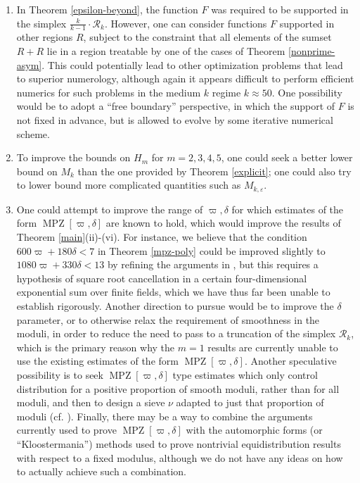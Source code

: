 \documentclass{bmcart}
\DeclareMathOperator*\MPZ{MPZ}
\theoremstyle{plain}
\theoremstyle{definition}
\newcommand\eps{\varepsilon}
\begin{document}
\begin{enumerate}
\item In Theorem \ref{epsilon-beyond}, the function $F$ was required to be supported in the simplex $\frac{k}{k-1} \cdot {\mathcal R}_k$.  However, one can consider functions $F$ supported in other regions $R$, subject to the constraint that all elements of the sumset $R+R$ lie in a region treatable by one of the cases of Theorem \ref{nonprime-asym}.  This could potentially lead to other optimization problems that lead to superior numerology, although again it appears difficult to perform efficient numerics for such problems in the medium $k$ regime $k \approx 50$.  One possibility would be to adopt a ``free boundary'' perspective, in which the support of $F$ is not fixed in advance, but is allowed to evolve by some iterative numerical scheme.
\item To improve the bounds on $H_m$ for $m=2,3,4,5$, one could seek a better lower bound on $M_k$ than the one provided by Theorem \ref{explicit}; one could also try to lower bound more complicated quantities such as $M_{k,\eps}$.
\item One could attempt to improve the range of $\varpi,\delta$ for which estimates of the form $\MPZ[\varpi,\delta]$ are known to hold, which would improve the results of Theorem \ref{main}(ii)-(vi).  For instance, we believe that the condition $600 \varpi + 180\delta < 7$ in Theorem \ref{mpz-poly} could be improved slightly to $1080 \varpi + 330 \delta < 13$ by refining the arguments in \cite{polymath8a}, but this requires a hypothesis of square root cancellation in a certain four-dimensional exponential sum over finite fields, which we have thus far been unable to establish rigorously.  Another direction to pursue would be to improve the $\delta$ parameter, or to otherwise relax the requirement of smoothness in the moduli, in order to reduce the need to pass to a truncation of the simplex ${\mathcal R}_k$, which is the primary reason why the $m=1$ results are currently unable to use the existing estimates of the form $\MPZ[\varpi,\delta]$.  Another speculative possibility is to seek $\MPZ[\varpi,\delta]$ type estimates which only control distribution for a positive proportion of smooth moduli, rather than for all moduli, and then to design a sieve $\nu$ adapted to just that proportion of moduli (cf. \cite{fouvry-invent}).  Finally, there may be a way to combine the arguments currently used to prove $\MPZ[\varpi,\delta]$ with the automorphic forms (or ``Kloostermania'') methods used to prove nontrivial equidistribution results with respect to a fixed modulus, although we do not have any ideas on how to actually achieve such a combination.

\end{enumerate}
\end{document}
